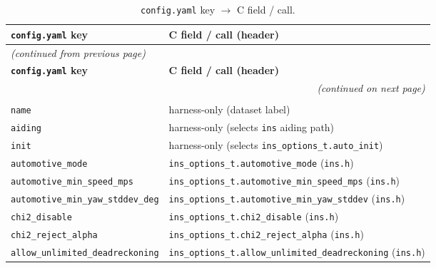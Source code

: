 \documentclass[11pt,a4paper]{article}
\newcommand{\code}[1]{\texttt{#1}}
\begin{document}
\begin{landscape}
\begin{center}
\small
\begin{longtable}{@{}p{6.5cm}p{16.5cm}@{}}
\caption{\code{config.yaml} key $\rightarrow$ C field / call.}
\label{tab:configyaml-xref}\\
\toprule
\textbf{\code{config.yaml} key} & \textbf{C field / call (header)} \\
\midrule
\endfirsthead
\multicolumn{2}{l}{\textit{(continued from previous page)}} \\
\toprule
\textbf{\code{config.yaml} key} & \textbf{C field / call (header)} \\
\midrule
\endhead
\midrule
\multicolumn{2}{r}{\textit{(continued on next page)}} \\
\endfoot
\bottomrule
\endlastfoot
\multicolumn{2}{l}{\textbf{Top level}} \\
\code{name}                & harness-only (dataset label) \\
\code{aiding}               & harness-only (selects \code{ins} aiding path) \\
\code{init}                 & harness-only (selects \code{ins\_\allowbreak{}options\_\allowbreak{}t.auto\_\allowbreak{}init}) \\
\code{automotive\_\allowbreak{}mode}     & \code{ins\_\allowbreak{}options\_\allowbreak{}t.automotive\_\allowbreak{}mode} (\code{ins.h}) \\
\code{automotive\_\allowbreak{}min\_\allowbreak{}speed\_\allowbreak{}mps} & \code{ins\_\allowbreak{}options\_\allowbreak{}t.automotive\_\allowbreak{}min\_\allowbreak{}speed\_\allowbreak{}mps} (\code{ins.h}) \\
\code{automotive\_\allowbreak{}min\_\allowbreak{}yaw\_\allowbreak{}stddev\_\allowbreak{}deg} & \code{ins\_\allowbreak{}options\_\allowbreak{}t.automotive\_\allowbreak{}min\_\allowbreak{}yaw\_\allowbreak{}stddev} (\code{ins.h}) \\
\code{chi2\_\allowbreak{}disable}        & \code{ins\_\allowbreak{}options\_\allowbreak{}t.chi2\_\allowbreak{}disable} (\code{ins.h}) \\
\code{chi2\_\allowbreak{}reject\_\allowbreak{}alpha}  & \code{ins\_\allowbreak{}options\_\allowbreak{}t.chi2\_\allowbreak{}reject\_\allowbreak{}alpha} (\code{ins.h}) \\
\code{allow\_\allowbreak{}unlimited\_\allowbreak{}deadreckoning} & \code{ins\_\allowbreak{}options\_\allowbreak{}t.allow\_\allowbreak{}unlimited\_\allowbreak{}deadreckoning} (\code{ins.h}) \\

\end{longtable}
\end{center}
\end{landscape}
\end{document}
